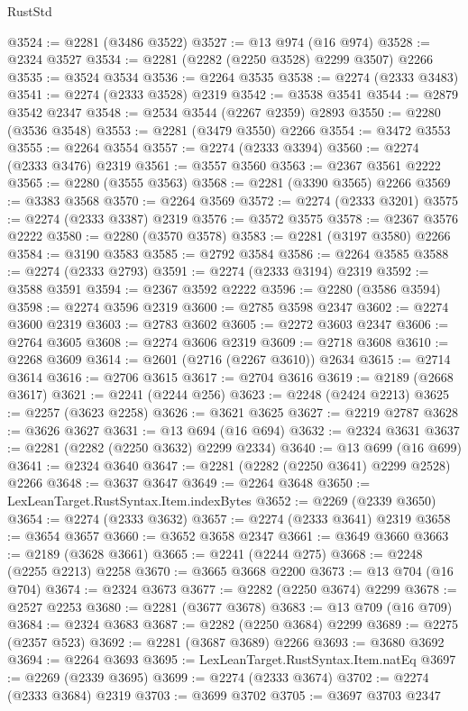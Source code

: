 \begin{lexlean}{RustStd}
\begin{coremodule}
{\begin{coremodule}
{{{{{{{{{{{{{{@3524 := @2281 (@3486 @3522)
@3527 := @13 @974 (@16 @974)
@3528 := @2324 @3527
@3534 := @2281 (@2282 (@2250 @3528) @2299 @3507) @2266
@3535 := @3524 @3534
@3536 := @2264 @3535
@3538 := @2274 (@2333 @3483)
@3541 := @2274 (@2333 @3528) @2319
@3542 := @3538 @3541
@3544 := @2879 @3542 @2347
@3548 := @2534 @3544 (@2267 @2359) @2893
@3550 := @2280 (@3536 @3548)
@3553 := @2281 (@3479 @3550) @2266
@3554 := @3472 @3553
@3555 := @2264 @3554
@3557 := @2274 (@2333 @3394)
@3560 := @2274 (@2333 @3476) @2319
@3561 := @3557 @3560
@3563 := @2367 @3561 @2222
@3565 := @2280 (@3555 @3563)
@3568 := @2281 (@3390 @3565) @2266
@3569 := @3383 @3568
@3570 := @2264 @3569
@3572 := @2274 (@2333 @3201)
@3575 := @2274 (@2333 @3387) @2319
@3576 := @3572 @3575
@3578 := @2367 @3576 @2222
@3580 := @2280 (@3570 @3578)
@3583 := @2281 (@3197 @3580) @2266
@3584 := @3190 @3583
@3585 := @2792 @3584
@3586 := @2264 @3585
@3588 := @2274 (@2333 @2793)
@3591 := @2274 (@2333 @3194) @2319
@3592 := @3588 @3591
@3594 := @2367 @3592 @2222
@3596 := @2280 (@3586 @3594)
@3598 := @2274 @3596 @2319
@3600 := @2785 @3598 @2347
@3602 := @2274 @3600 @2319
@3603 := @2783 @3602
@3605 := @2272 @3603 @2347
@3606 := @2764 @3605
@3608 := @2274 @3606 @2319
@3609 := @2718 @3608
@3610 := @2268 @3609
@3614 := @2601 (@2716 (@2267 @3610)) @2634
@3615 := @2714 @3614
@3616 := @2706 @3615
@3617 := @2704 @3616
@3619 := @2189 (@2668 @3617)
@3621 := @2241 (@2244 @256)
@3623 := @2248 (@2424 @2213)
@3625 := @2257 (@3623 @2258)
@3626 := @3621 @3625
@3627 := @2219 @2787
@3628 := @3626 @3627
@3631 := @13 @694 (@16 @694)
@3632 := @2324 @3631
@3637 := @2281 (@2282 (@2250 @3632) @2299 @2334)
@3640 := @13 @699 (@16 @699)
@3641 := @2324 @3640
@3647 := @2281 (@2282 (@2250 @3641) @2299 @2528) @2266
@3648 := @3637 @3647
@3649 := @2264 @3648
@3650 := LexLeanTarget.RustSyntax.Item.indexBytes
@3652 := @2269 (@2339 @3650)
@3654 := @2274 (@2333 @3632)
@3657 := @2274 (@2333 @3641) @2319
@3658 := @3654 @3657
@3660 := @3652 @3658 @2347
@3661 := @3649 @3660
@3663 := @2189 (@3628 @3661)
@3665 := @2241 (@2244 @275)
@3668 := @2248 (@2255 @2213) @2258
@3670 := @3665 @3668 @2200
@3673 := @13 @704 (@16 @704)
@3674 := @2324 @3673
@3677 := @2282 (@2250 @3674) @2299
@3678 := @2527 @2253
@3680 := @2281 (@3677 @3678)
@3683 := @13 @709 (@16 @709)
@3684 := @2324 @3683
@3687 := @2282 (@2250 @3684) @2299
@3689 := @2275 (@2357 @523)
@3692 := @2281 (@3687 @3689) @2266
@3693 := @3680 @3692
@3694 := @2264 @3693
@3695 := LexLeanTarget.RustSyntax.Item.natEq
@3697 := @2269 (@2339 @3695)
@3699 := @2274 (@2333 @3674)
@3702 := @2274 (@2333 @3684) @2319
@3703 := @3699 @3702
@3705 := @3697 @3703 @2347
}}}}}}}}}}}}}}
\end{coremodule}}
\end{coremodule}
\end{lexlean}
